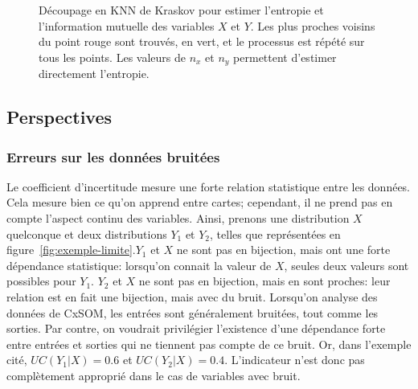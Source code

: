 \begin{figure}
\begin{minipage}{0.45\textwidth}
\caption{Découpage en KNN de Kraskov pour estimer l'entropie et l'information mutuelle des variables $X$ et $Y$. Les plus proches voisins du point rouge sont trouvés, en vert, et le processus est répété sur tous les points. Les valeurs de $n_x$ et $n_y$ permettent d'estimer directement l'entropie.}
\label{fig:kraskov}
\end{minipage}
\end{figure}


\subsection{Perspectives}

\subsubsection{Erreurs sur les données bruitées}

Le coefficient d'incertitude mesure une forte relation statistique entre les données. Cela mesure bien ce qu'on apprend entre cartes; cependant, il ne prend pas en compte l'aspect continu des variables. Ainsi, prenons une distribution $X$ quelconque et deux distributions $Y_1$ et $Y_2$, telles que représentées en figure~\ref{fig:exemple-limite}.$Y_1$ et $X$ ne sont pas en bijection, mais ont une forte dépendance statistique: lorsqu'on connait la valeur de $X$, seules deux valeurs sont possibles pour $Y_1$.
$Y_2$ et $X$ ne sont pas en bijection, mais en sont proches: leur relation est en fait une bijection, mais avec du bruit. Lorsqu'on analyse des données de CxSOM, les entrées sont généralement bruitées, tout comme les sorties. Par contre, on voudrait privilégier l'existence d'une dépendance forte entre entrées et sorties qui ne tiennent pas compte de ce bruit. Or, dans l'exemple cité, $UC(Y_1|X) = 0.6$ et $UC(Y_2|X) = 0.4$. L'indicateur n'est donc pas complètement approprié dans le cas de variables avec bruit.

